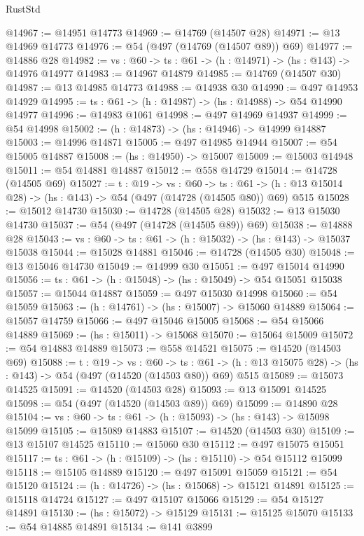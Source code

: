 \begin{lexlean}{RustStd}
\begin{coremodule}
@14967 := @14951 @14773
@14969 := @14769 (@14507 @28)
@14971 := @13 @14969 @14773
@14976 := @54 (@497 (@14769 (@14507 @89)) @69)
@14977 := @14886 @28
@14982 := {vs : @60} -> {ts : @61} -> (h : @14971) -> (hs : @143) -> @14976 @14977
@14983 := @14967 @14879
@14985 := @14769 (@14507 @30)
@14987 := @13 @14985 @14773
@14988 := @14938 @30
@14990 := @497 @14953 @14929
@14995 := {ts : @61} -> (h : @14987) -> (hs : @14988) -> @54 @14990 @14977
@14996 := @14983 @1061
@14998 := @497 @14969 @14937
@14999 := @54 @14998
@15002 := (h : @14873) -> (hs : @14946) -> @14999 @14887
@15003 := @14996 @14871
@15005 := @497 @14985 @14944
@15007 := @54 @15005 @14887
@15008 := (hs : @14950) -> @15007
@15009 := @15003 @14948
@15011 := @54 @14881 @14887
@15012 := @558 @14729
@15014 := @14728 (@14505 @69)
@15027 := {t : @19} ->
  {vs : @60} ->
  {ts : @61} -> (h : @13 @15014 @28) -> (hs : @143) -> @54 (@497 (@14728 (@14505 @80)) @69) @515
@15028 := @15012 @14730
@15030 := @14728 (@14505 @28)
@15032 := @13 @15030 @14730
@15037 := @54 (@497 (@14728 (@14505 @89)) @69)
@15038 := @14888 @28
@15043 := {vs : @60} -> {ts : @61} -> (h : @15032) -> (hs : @143) -> @15037 @15038
@15044 := @15028 @14881
@15046 := @14728 (@14505 @30)
@15048 := @13 @15046 @14730
@15049 := @14999 @30
@15051 := @497 @15014 @14990
@15056 := {ts : @61} -> (h : @15048) -> (hs : @15049) -> @54 @15051 @15038
@15057 := @15044 @14887
@15059 := @497 @15030 @14998
@15060 := @54 @15059
@15063 := (h : @14761) -> (hs : @15007) -> @15060 @14889
@15064 := @15057 @14759
@15066 := @497 @15046 @15005
@15068 := @54 @15066 @14889
@15069 := (hs : @15011) -> @15068
@15070 := @15064 @15009
@15072 := @54 @14883 @14889
@15073 := @558 @14521
@15075 := @14520 (@14503 @69)
@15088 := {t : @19} ->
  {vs : @60} ->
  {ts : @61} -> (h : @13 @15075 @28) -> (hs : @143) -> @54 (@497 (@14520 (@14503 @80)) @69) @515
@15089 := @15073 @14525
@15091 := @14520 (@14503 @28)
@15093 := @13 @15091 @14525
@15098 := @54 (@497 (@14520 (@14503 @89)) @69)
@15099 := @14890 @28
@15104 := {vs : @60} -> {ts : @61} -> (h : @15093) -> (hs : @143) -> @15098 @15099
@15105 := @15089 @14883
@15107 := @14520 (@14503 @30)
@15109 := @13 @15107 @14525
@15110 := @15060 @30
@15112 := @497 @15075 @15051
@15117 := {ts : @61} -> (h : @15109) -> (hs : @15110) -> @54 @15112 @15099
@15118 := @15105 @14889
@15120 := @497 @15091 @15059
@15121 := @54 @15120
@15124 := (h : @14726) -> (hs : @15068) -> @15121 @14891
@15125 := @15118 @14724
@15127 := @497 @15107 @15066
@15129 := @54 @15127 @14891
@15130 := (hs : @15072) -> @15129
@15131 := @15125 @15070
@15133 := @54 @14885 @14891
@15134 := @141 @3899

\end{coremodule}
\end{lexlean}
